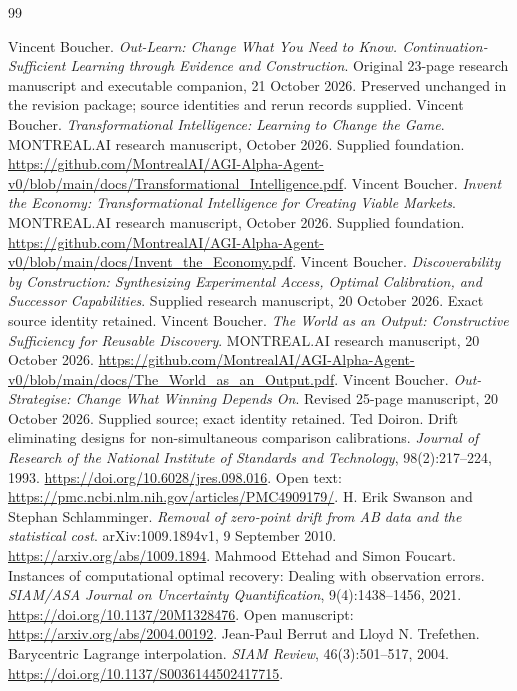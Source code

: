 \documentclass[11pt,letterpaper]{article}
\theoremstyle{definition}\newtheorem{definition}[theorem]{Definition}
\theoremstyle{remark}\newtheorem{remark}[theorem]{Remark}
\begin{document}
\clearpage
\begin{thebibliography}{99}
\small\raggedright
{} Vincent Boucher. \emph{Out-Learn: Change What You Need to Know. Continuation-Sufficient Learning through Evidence and Construction}. Original 23-page research manuscript and executable companion, 21 October 2026. Preserved unchanged in the revision package; source identities and rerun records supplied.
 Vincent Boucher. \emph{Transformational Intelligence: Learning to Change the Game}. MONTREAL.AI research manuscript, October 2026. Supplied foundation. \url{https://github.com/MontrealAI/AGI-Alpha-Agent-v0/blob/main/docs/Transformational_Intelligence.pdf}.
 Vincent Boucher. \emph{Invent the Economy: Transformational Intelligence for Creating Viable Markets}. MONTREAL.AI research manuscript, October 2026. Supplied foundation. \url{https://github.com/MontrealAI/AGI-Alpha-Agent-v0/blob/main/docs/Invent_the_Economy.pdf}.
 Vincent Boucher. \emph{Discoverability by Construction: Synthesizing Experimental Access, Optimal Calibration, and Successor Capabilities}. Supplied research manuscript, 20 October 2026. Exact source identity retained.
 Vincent Boucher. \emph{The World as an Output: Constructive Sufficiency for Reusable Discovery}. MONTREAL.AI research manuscript, 20 October 2026. \url{https://github.com/MontrealAI/AGI-Alpha-Agent-v0/blob/main/docs/The_World_as_an_Output.pdf}.
 Vincent Boucher. \emph{Out-Strategise: Change What Winning Depends On}. Revised 25-page manuscript, 20 October 2026. Supplied source; exact identity retained.
 Ted Doiron. Drift eliminating designs for non-simultaneous comparison calibrations. \emph{Journal of Research of the National Institute of Standards and Technology}, 98(2):217--224, 1993. \url{https://doi.org/10.6028/jres.098.016}. Open text: \url{https://pmc.ncbi.nlm.nih.gov/articles/PMC4909179/}.
 H. Erik Swanson and Stephan Schlamminger. \emph{Removal of zero-point drift from AB data and the statistical cost}. arXiv:1009.1894v1, 9 September 2010. \url{https://arxiv.org/abs/1009.1894}.
 Mahmood Ettehad and Simon Foucart. Instances of computational optimal recovery: Dealing with observation errors. \emph{SIAM/ASA Journal on Uncertainty Quantification}, 9(4):1438--1456, 2021. \url{https://doi.org/10.1137/20M1328476}. Open manuscript: \url{https://arxiv.org/abs/2004.00192}.
 Jean-Paul Berrut and Lloyd N. Trefethen. Barycentric Lagrange interpolation. \emph{SIAM Review}, 46(3):501--517, 2004. \url{https://doi.org/10.1137/S0036144502417715}.

\end{thebibliography}
\end{document}
